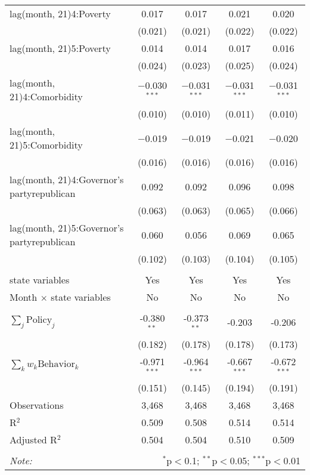 \begin{tabular}{@{\extracolsep{1pt}}lcccc}
  lag(month, 21)4:Poverty & 0.017 & 0.017 & 0.021 & 0.020 \\ 
  & (0.021) & (0.021) & (0.022) & (0.022) \\ 
  lag(month, 21)5:Poverty & 0.014 & 0.014 & 0.017 & 0.016 \\ 
  & (0.024) & (0.023) & (0.025) & (0.024) \\ 
  lag(month, 21)4:Comorbidity & $-$0.030$^{***}$ & $-$0.031$^{***}$ & $-$0.031$^{***}$ & $-$0.031$^{***}$ \\ 
  & (0.010) & (0.010) & (0.011) & (0.010) \\ 
  lag(month, 21)5:Comorbidity & $-$0.019 & $-$0.019 & $-$0.021 & $-$0.020 \\ 
  & (0.016) & (0.016) & (0.016) & (0.016) \\ 
  lag(month, 21)4:Governor's partyrepublican & 0.092 & 0.092 & 0.096 & 0.098 \\ 
  & (0.063) & (0.063) & (0.065) & (0.066) \\ 
  lag(month, 21)5:Governor's partyrepublican & 0.060 & 0.056 & 0.069 & 0.065 \\ 
  & (0.102) & (0.103) & (0.104) & (0.105) \\ 
 \hline \\[-1.8ex] 
state variables & Yes & Yes & Yes & Yes \\ 
Month $\times$ state variables & No & No & No & No \\ 
\hline \\[-1.8ex] 
$\sum_j \mathrm{Policy}_j$ & -0.380$^{**}$ & -0.373$^{**}$ & -0.203 & -0.206 \\ 
 & (0.182) & (0.178) & (0.178) & (0.173) \\ 
$\sum_k w_k \mathrm{Behavior}_k$ & -0.971$^{***}$ & -0.964$^{***}$ & -0.667$^{***}$ & -0.672$^{***}$ \\ 
 & (0.151) & (0.145) & (0.194) & (0.191) \\ 
Observations & 3,468 & 3,468 & 3,468 & 3,468 \\ 
R$^{2}$ & 0.509 & 0.508 & 0.514 & 0.514 \\ 
Adjusted R$^{2}$ & 0.504 & 0.504 & 0.510 & 0.509 \\ 
\hline 
\hline \\[-1.8ex] 
\textit{Note:}  & \multicolumn{4}{r}{$^{*}$p$<$0.1; $^{**}$p$<$0.05; $^{***}$p$<$0.01} \\ 
\end{tabular} 